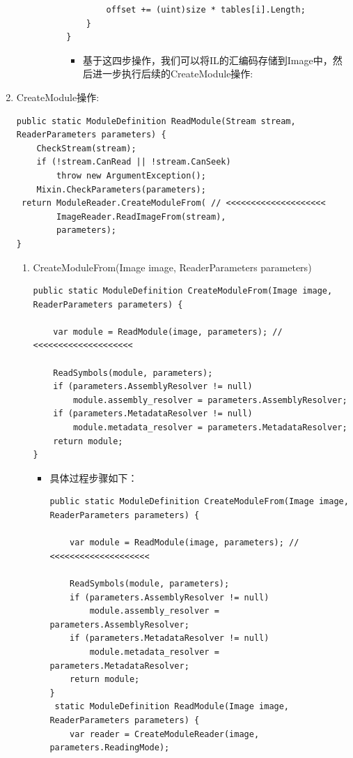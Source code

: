 \documentclass[9pt, b5paper]{article}
\begin{document}
\begin{enumerate}
\begin{enumerate}
\begin{enumerate}
\begin{enumerate}
\begin{verbatim}
        offset += (uint)size * tables[i].Length;
    }
}
\end{verbatim}
\begin{itemize}
\item 基于这四步操作，我们可以将IL的汇编码存储到Image中，然后进一步执行后续的CreateModule操作:
\end{itemize}
\end{enumerate}
\end{enumerate}
\end{enumerate}
\item CreateModule操作:
\label{sec-10-1-3-2}
\begin{verbatim}
public static ModuleDefinition ReadModule(Stream stream, ReaderParameters parameters) {
    CheckStream(stream);
    if (!stream.CanRead || !stream.CanSeek)
        throw new ArgumentException();
    Mixin.CheckParameters(parameters);
 return ModuleReader.CreateModuleFrom( // <<<<<<<<<<<<<<<<<<<<  
        ImageReader.ReadImageFrom(stream),
        parameters);
}
\end{verbatim}
\begin{enumerate}
\item CreateModuleFrom(Image image, ReaderParameters parameters)
\label{sec-10-1-3-2-1}
\begin{verbatim}
public static ModuleDefinition CreateModuleFrom(Image image, ReaderParameters parameters) {

    var module = ReadModule(image, parameters); // <<<<<<<<<<<<<<<<<<<< 

    ReadSymbols(module, parameters);
    if (parameters.AssemblyResolver != null)
        module.assembly_resolver = parameters.AssemblyResolver;
    if (parameters.MetadataResolver != null)
        module.metadata_resolver = parameters.MetadataResolver;
    return module;
}
\end{verbatim}
\begin{itemize}
\item 具体过程步骤如下：
\begin{verbatim}
public static ModuleDefinition CreateModuleFrom(Image image, ReaderParameters parameters) {

    var module = ReadModule(image, parameters); // <<<<<<<<<<<<<<<<<<<< 

    ReadSymbols(module, parameters);
    if (parameters.AssemblyResolver != null)
        module.assembly_resolver = parameters.AssemblyResolver;
    if (parameters.MetadataResolver != null)
        module.metadata_resolver = parameters.MetadataResolver;
    return module;
}
 static ModuleDefinition ReadModule(Image image, ReaderParameters parameters) {
    var reader = CreateModuleReader(image, parameters.ReadingMode);


\end{verbatim}
\end{itemize}
\end{enumerate}
\end{enumerate}
\end{document}
